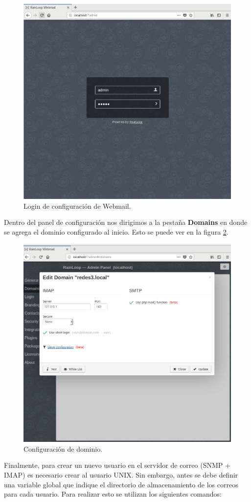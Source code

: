 \FloatBarrier
\begin{figure}[htbp!]
		\centering
			\includegraphics[width=.65 \textwidth]{images/webmail}
		\caption{Login de configuración de Webmail.}
		\label{image:webmail}
\end{figure}
\FloatBarrier

Dentro del panel de configuración nos dirigimos a la pestaña \textbf{Domains} en donde se agrega el dominio configurado al inicio. Esto se puede ver en la figura \ref{image:webmaildomain}.

\FloatBarrier
\begin{figure}[htbp!]
		\centering
			\includegraphics[width=.65 \textwidth]{images/webmaildomain}
		\caption{Configuración de dominio.}
		\label{image:webmaildomain}
\end{figure}
\FloatBarrier

Finalmente, para crear un nuevo usuario en el servidor de correo (SNMP + IMAP) es necesario crear al usuario UNIX. Sin embargo, antes se debe definir una variable global que indique el directorio de almacenamiento de los correos para cada usuario. Para realizar esto se utilizan los siguientes comandos:

